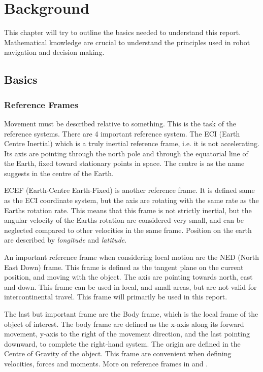 

\chapter{Background}
This chapter will try to outline the basics needed to understand this report. Mathematical
knowledge are crucial to understand the principles used in robot navigation and decision
making. 


\section{Basics}

\subsection{Reference Frames}
	Movement must be described relative to something. This is the task of the reference systems. There are
	4 important reference system. The ECI (Earth Centre Inertial) which is a truly inertial reference
	frame, i.e. it is not accelerating. Its axis are pointing through the north pole and through the
	equatorial line of the Earth, fixed toward stationary points in space. The centre is as the name
	suggests in the centre of the Earth. 
	
	ECEF (Earth-Centre Earth-Fixed) is another reference frame. It is defined same as the ECI coordinate
	system, but the axis are rotating with the same rate as the Earths rotation rate. This means that this frame
	is not
	strictly inertial, but the angular velocity of the Earths rotation are considered very small, and can
	be neglected compared to other velocities in the same frame. Position on the earth are described by
	\textit{longitude} and \textit{latitude}.

	An important reference frame when considering local motion are the NED (North East Down) frame. This
	frame is defined as the tangent plane on the current position, and moving with the object. The axis
	are pointing towards north, east and down. This frame can be used in local, and small areas, but are
	not valid for intercontinental travel. This frame will primarily be used in this report. 

	The last but important frame are the Body frame, which is the local frame of the object of interest.
	The body frame are defined as the x-axis along its forward movement, y-axis to the right of the
	movement direction, and the last pointing downward, to complete the right-hand system. The
	origin are defined in the Centre of Gravity of the object. This frame are convenient when
	defining velocities, forces and moments. More on reference frames in \cite{fossen} and
    \cite{forsell}.


